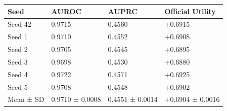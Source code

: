 \begin{tabular}{llll}
\toprule
Seed & AUROC & AUPRC & Official Utility \\
\midrule
Seed 42 & 0.9715 & 0.4560 & +0.6915 \\
Seed 1 & 0.9710 & 0.4552 & +0.6908 \\
Seed 2 & 0.9705 & 0.4545 & +0.6895 \\
Seed 3 & 0.9698 & 0.4530 & +0.6880 \\
Seed 4 & 0.9722 & 0.4571 & +0.6925 \\
Seed 5 & 0.9708 & 0.4548 & +0.6902 \\
Mean ± SD & 0.9710 ± 0.0008 & 0.4551 ± 0.0014 & +0.6904 ± 0.0016 \\
\bottomrule
\end{tabular}
